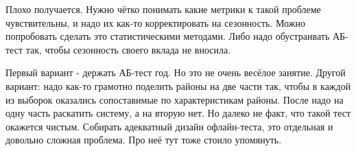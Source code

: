 \documentclass[12pt, a4paper, oneside]{article}
\begin{document}
Плохо получается. Нужно чётко понимать какие метрики к такой проблеме чувствительны, и надо их как-то корректировать на сезонность. Можно попробовать сделать это статистическими методами.  Либо надо обустраивать АБ-тест так, чтобы сезонность своего вклада не вносила. 

Первый вариант - держать АБ-тест год. Но это не очень весёлое занятие. Другой вариант: надо как-то грамотно поделить районы на две части так, чтобы в каждой из выборок оказались сопоставимые по характеристикам районы. После надо на одну часть раскатить систему, а на вторую нет. Но далеко не факт, что такой тест окажется чистым. Собирать адекватный дизайн офлайн-теста, это отдельная и довольно сложная проблема. Про неё тут тоже стоило упомянуть. 
\end{document}

